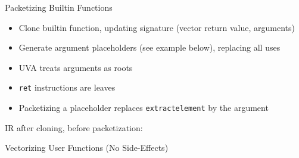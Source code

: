 \begin{frame}[fragile]{Packetizing Builtin Functions}

\begin{itemize}
    \item Clone builtin function, updating signature (vector return value, arguments)
    \item Generate argument placeholders (see example below), replacing all uses
    \item UVA treats arguments as roots
    \item \texttt{ret} instructions are leaves
    \item Packetizing a placeholder replaces \texttt{extractelement} by the argument
\end{itemize}

IR after cloning, before packetization:


\end{frame}


\begin{frame}{Vectorizing User Functions (No Side-Effects)}


\end{frame}


